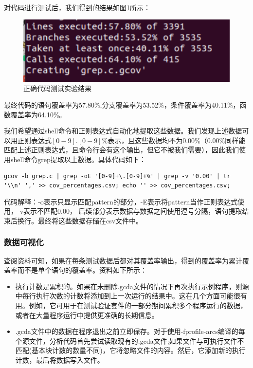 \documentclass[12pt, a4paper, oneside,bibend=bibtex]{ctexart}
\begin{document}
对代码进行测试后，我们得到的结果如图\ref{handleonce1}所示：

\begin{figure}[htbp]
    \centering
    \includegraphics[width=14cm]{images/handleonce1.png}
    \caption{正确代码测试实验结果}
    \label{handleonce1}
\end{figure}

最终代码的语句覆盖率为57.80\%,分支覆盖率为53.52\%，条件覆盖率为40.11\%，函数覆盖率为64.10\%。

我们希望通过shell命令和正则表达式自动化地提取这些数据。我们发现上述数据可以用正则表达式$[0-9].[0-9]\%$表示，且这些数据均不为0.00\%（0.00\%同样能匹配上述正则表达式，且命令行会有这个输出，但它不被我们需要），因此我们使用shell命令grep提取以上数据。具体代码如下：

\begin{lstlisting}[caption={}]
gcov -b grep.c | grep -oE '[0-9]+\.[0-9]+%' | grep -v '0.00' | tr '\\n' ',' >> cov_percentages.csv; echo '' >> cov_percentages.csv;
\end{lstlisting}

代码解释：-o表示只显示匹配pattern的部分，-E表示将pattern当作正则表达式使用，-v表示不匹配0.00， 后续部分表示数据与数据之间使用逗号分隔，语句提取结束后换行。最终将这些数据存储在csv文件中。
\subsubsection{数据可视化}
查阅资料可知，如果在每条测试数据后都对其覆盖率输出，得到的覆盖率为累计覆盖率而不是单个语句的覆盖率。资料如下所示：

\begin{itemize}
    \item 执行计数是累积的。如果在未删除.gcda文件的情况下再次执行示例程序，则源中每行执行次数的计数将添加到上一次运行的结果中。这在几个方面可能很有用。例如，它可用于在测试验证套件的一部分期间累积多个程序运行的数据，或者在大量程序运行中提供更准确的长期信息。
    \item .gcda文件中的数据在程序退出之前立即保存。对于使用-fprofile-arcs编译的每个源文件，分析代码首先尝试读取现有的.gcda文件;如果文件与可执行文件不匹配(基本块计数的数量不同)，它将忽略文件的内容。然后，它添加新的执行计数，最后将数据写入文件。
\end{itemize}
\end{document}
